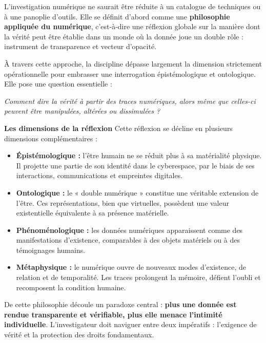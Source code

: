 \documentclass[12pt,a4paper]{report}
\begin{document}
	{\Large
		
		{\Large

}
L’investigation numérique ne saurait être réduite à un catalogue de techniques ou à une panoplie d’outils. 
Elle se définit d’abord comme une \textbf{philosophie appliquée du numérique}, c’est-à-dire une réflexion globale 
sur la manière dont la vérité peut être établie dans un monde où la donnée joue un double rôle : instrument de transparence et vecteur d’opacité.

À travers cette approche, la discipline dépasse largement la dimension strictement opérationnelle 
pour embrasser une interrogation épistémologique et ontologique. 
Elle pose une question essentielle : 

\textit{Comment dire la vérité à partir des traces numériques, alors même que celles-ci peuvent être manipulées, altérées ou dissimulées ?}

\textbf{Les dimensions de la réflexion}
Cette réflexion se décline en plusieurs dimensions complémentaires :  

\begin{itemize}
    \item \textbf{Épistémologique :} l’être humain ne se réduit plus à sa matérialité physique. 
    Il projette une partie de son identité dans le cyberespace, par le biais de ses interactions, communications et empreintes digitales.  

    \item \textbf{Ontologique :} le « double numérique » constitue une véritable extension de l’être. 
    Ces représentations, bien que virtuelles, possèdent une valeur existentielle équivalente à sa présence matérielle.  

    \item \textbf{Phénoménologique :} les données numériques apparaissent comme des manifestations d’existence, comparables à des objets matériels ou à des témoignages humains.  

    \item \textbf{Métaphysique :} le numérique ouvre de nouveaux modes d’existence, de relation et de temporalité. 
    Les traces prolongent la mémoire, défient l’oubli et recomposent la condition humaine.  
\end{itemize}

\noindent
De cette philosophie découle un paradoxe central : 
\textbf{plus une donnée est rendue transparente et vérifiable, plus elle menace l’intimité individuelle}.  
L’investigateur doit naviguer entre deux impératifs : l’exigence de vérité et la protection des droits fondamentaux.

}
\end{document}

